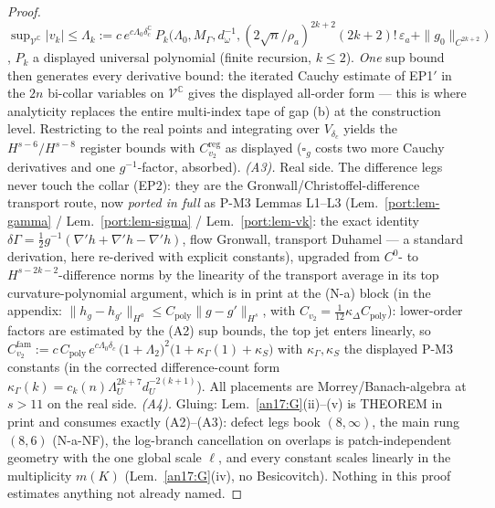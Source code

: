 \begin{proof}
$\sup_{\mathcal V^{\mathbb C}}|v_k|\le\Lambda_k:=
c\,e^{c\Lambda_0\delta_c^{\mathbb C}}\,
P_k\bigl(\Lambda_0,M_\Gamma,d_\omega^{-1},
(2\sqrt n/\rho_a)^{2k+2}(2k+2)!\,\varepsilon_a
+\|g_0\|_{C^{2k+2}}\bigr)$, $P_k$ a displayed universal polynomial
(finite recursion, $k\le2$). \emph{One} sup bound then generates every
derivative bound: the iterated Cauchy estimate of EP1$'$ in the $2n$
bi-collar variables on $\mathcal V^{\mathbb C}$ gives the displayed
all-order form --- this is where analyticity replaces the entire
multi-index tape of gap (b) at the construction level. Restricting to
the real points and integrating over $V_{\delta_c}$ yields the
$H^{s-6}/H^{s-8}$ register bounds with $C^{\mathrm{reg}}_{v_2}$ as
displayed ($\square_g$ costs two more Cauchy derivatives and one
$g^{-1}$-factor, absorbed).
\emph{(A3).} Real side. The difference legs never touch the collar
(EP2): they are the Gronwall/Christoffel-difference transport route,
now \emph{ported in full} as P-M3 Lemmas L1--L3 (Lem.~\ref{port:lem-gamma} / Lem.~\ref{port:lem-sigma} / Lem.~\ref{port:lem-vk}: the exact identity
$\delta\Gamma=\tfrac12g^{-1}(\nabla'h+\nabla'h-\nabla'h)$, flow
Gronwall, transport Duhamel --- a standard derivation, here
re-derived with explicit constants), upgraded from $C^0$- to
$H^{s-2k-2}$-difference norms by the linearity of the transport
average in its top curvature-polynomial argument, which is in print at
the (N-a) block (in the appendix:
$\|h_g-h_{g'}\|_{H^a}\le C_{\mathrm{poly}}\|g-g'\|_{H^s}$, with
$C_{v_2}=\tfrac1{12}\kappa_\Delta C_{\mathrm{poly}}$): lower-order
factors are estimated by the (A2) sup bounds, the top jet enters
linearly, so
$C^{\mathrm{fam}}_{v_2}:=c\,C_{\mathrm{poly}}\,
e^{c\Lambda_0\delta_c}\,\bigl(1+\Lambda_2\bigr)^2
\bigl(1+\kappa_\Gamma(1)+\kappa_S\bigr)$ with
$\kappa_\Gamma,\kappa_S$ the displayed P-M3 constants (in the
corrected difference-count form
$\kappa_\Gamma(k)=c_k(n)\Lambda_U^{2k+7}d_U^{-2(k+1)}$). All placements
are Morrey/Banach-algebra at $s>11$ on the real side.
\emph{(A4).} Gluing: Lem.~\ref{an17:G}(ii)--(v) is THEOREM in print and consumes exactly (A2)--(A3): defect legs book
$(8,\infty)$, the main rung $(8,6)$ (N-a-NF), the log-branch
cancellation on overlaps is patch-independent geometry with the one
global scale $\ell$, and every constant scales linearly in the
multiplicity $m(K)$ (Lem.~\ref{an17:G}(iv), no Besicovitch). Nothing in this
proof estimates anything not already named. \qedhere
\end{proof}

